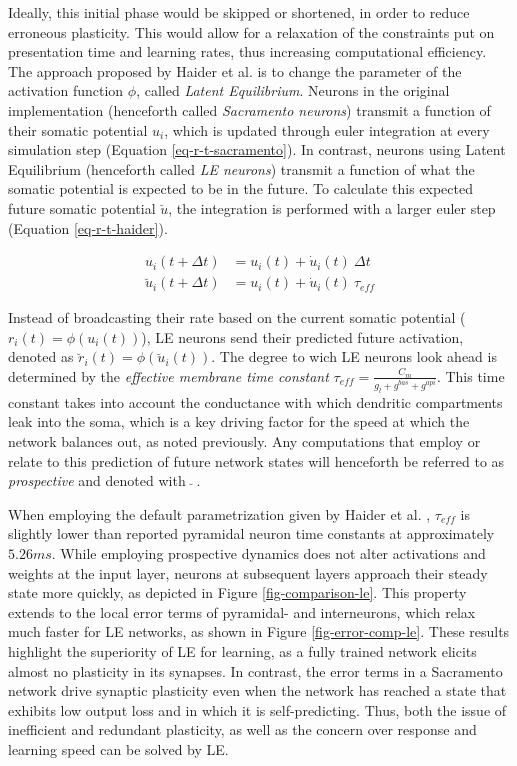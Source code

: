 Ideally, this initial phase would be skipped or shortened, in order to reduce erroneous plasticity. This would allow for
a relaxation of the constraints put on presentation time and learning rates, thus increasing computational efficiency.
The approach proposed by Haider et al. is to change the parameter of the activation function $\phi$, called
\textit{Latent Equilibrium}. Neurons in the original implementation (henceforth called \textit{Sacramento neurons})
transmit a function of their somatic potential $u_i$, which is updated through euler integration at every simulation
step (Equation \ref{eq-r-t-sacramento}). In contrast, neurons using Latent Equilibrium (henceforth called \textit{LE
neurons}) transmit a function of what the somatic potential is expected to be in the future. To calculate this expected
future somatic potential $\breve{u}$, the integration is performed with a larger euler step (Equation
\ref{eq-r-t-haider}).

\begin{align}
  u_i(t+ \Delta t)          & = u_i(t) + \dot{u}_i(t) \ \Delta t \label{eq-r-t-sacramento} \\
  \breve{u}_i(t + \Delta t) & = u_i(t) + \dot{u}_i(t) \ \tau_{eff} \label{eq-r-t-haider}
\end{align}

Instead of broadcasting their rate based on the current somatic potential ($r_i(t) = \phi(u_i(t))$), LE neurons send
their predicted future activation, denoted as $\breve{r}_i(t) = \phi(\breve{u}_i(t))$. The degree to wich LE neurons
look ahead is determined by the \textit{effective membrane time constant} $\tau_{eff} = \frac{C_m}{g_l + g^{bas} +
g^{api}}$. This time constant takes into account the conductance with which dendritic compartments leak into the soma,
which is a key driving factor for the speed at which the network balances out, as noted previously. Any computations
that employ or relate to this prediction of future network states will henceforth be referred to as \textit{prospective}
and denoted with $\ \breve{} \ $.

When employing the default parametrization given by Haider et al. , $\tau_{eff}$ is
slightly lower than reported pyramidal neuron time constants \citep{McCormick1985} at approximately $5.26ms$. While
employing prospective dynamics does not alter activations and weights at the input layer, neurons at subsequent layers
approach their steady state more quickly, as depicted in Figure \ref{fig-comparison-le}. This property extends to the
local error terms of pyramidal- and interneurons, which relax much faster for LE networks, as shown in Figure
\ref{fig-error-comp-le}. These results highlight the superiority of LE for learning, as a fully trained network elicits
almost no plasticity in its synapses. In contrast, the error terms in a Sacramento network drive synaptic plasticity
even when the network has reached a state that exhibits low output loss and in which it is self-predicting. Thus, both
the issue of inefficient and redundant plasticity, as well as the concern over response and learning speed can be solved
by LE.\newline


